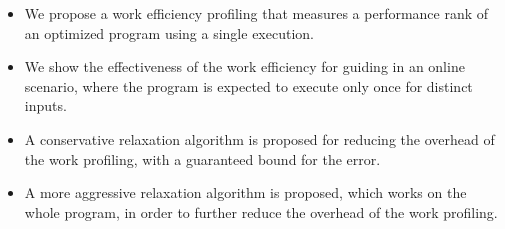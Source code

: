     \begin{itemize}[leftmargin=3mm]

        \item We propose a work efficiency profiling that measures a performance rank of an optimized program using a single execution.

        \item We show the effectiveness of the work efficiency for guiding {\itercomp} in an online scenario, where the program is expected
        to execute only once for distinct inputs.

        \item A conservative relaxation algorithm is proposed for reducing the overhead of the work profiling, with a guaranteed bound for
        the error.

        \item A more aggressive relaxation algorithm is proposed, which works on the whole program, in order to further reduce the overhead
        of the work profiling.

    \end{itemize}
